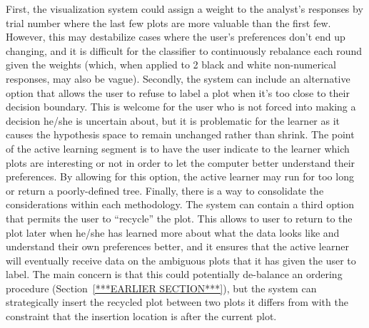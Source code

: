 First, the visualization system could assign a weight to the analyst's responses
by trial number where the last few plots are more valuable than the first few.
However, this may destabilize cases where the user's preferences don’t end up
changing, and it is difficult for the classifier to continuously rebalance each
round given the weights (which, when applied to 2 black and white non-numerical
responses, may also be vague). Secondly, the system can include an alternative
option that allows the user to refuse to label a plot when it's too close to
their decision boundary. This is welcome for the user who is not forced into
making a decision he/she is uncertain about, but it is problematic for the
learner as it causes the hypothesis space to remain unchanged rather than
shrink. The point of the active learning segment is to have the user indicate to
the learner which plots are interesting or not in order to let the computer
better understand their preferences. By allowing for this option, the active
learner may run for too long or return a poorly-defined tree. Finally, there is
a way to consolidate the considerations within each methodology. The system can
contain a third option that permits the user to ``recycle'' the plot. This
allows to user to return to the plot later when he/she has learned more about
what the data looks like and understand their own preferences better, and it
ensures that the active learner will eventually receive data on the ambiguous
plots that it has given the user to label. The main concern is that this could
potentially de-balance an ordering procedure (Section~\ref{***EARLIER
	SECTION***}), but the system can strategically insert the recycled plot 
	between
two plots it differs from with the constraint that the insertion location is
after the current plot.

